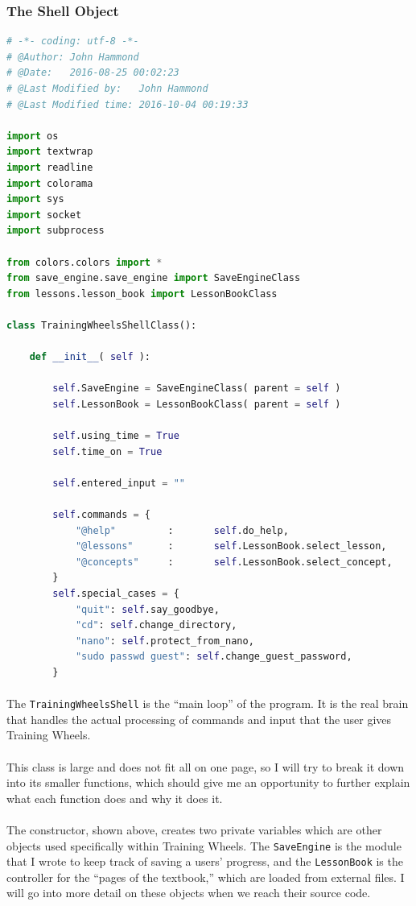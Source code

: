 \documentclass[11pt]{article}
\begin{document}
	\subsubsection{The Shell Object}

	\begin{lstlisting}[language=Python]
# -*- coding: utf-8 -*-
# @Author: John Hammond
# @Date:   2016-08-25 00:02:23
# @Last Modified by:   John Hammond
# @Last Modified time: 2016-10-04 00:19:33

import os
import textwrap
import readline
import colorama
import sys
import socket
import subprocess

from colors.colors import *
from save_engine.save_engine import SaveEngineClass
from lessons.lesson_book import LessonBookClass

class TrainingWheelsShellClass():

	def __init__( self ):

		self.SaveEngine = SaveEngineClass( parent = self )
		self.LessonBook = LessonBookClass( parent = self )

		self.using_time = True
		self.time_on = True

		self.entered_input = ""

		self.commands = {
			"@help" 		: 		self.do_help,		
			"@lessons" 		:	 	self.LessonBook.select_lesson,
			"@concepts" 	:	 	self.LessonBook.select_concept,
		}
		self.special_cases = {
			"quit": self.say_goodbye,
			"cd": self.change_directory,
			"nano": self.protect_from_nano,
			"sudo passwd guest": self.change_guest_password,
		}
	\end{lstlisting}

	\paragraph{} The \texttt{TrainingWheelsShell} is the ``main loop'' of the program. It is the real brain that handles the actual processing of commands and input that the user gives Training Wheels. 

	\paragraph{} This class is large and does not fit all on one page, so I will try to break it down into its smaller functions, which should give me an opportunity to further explain what each function does and why it does it.

	\paragraph{} The constructor, shown above, creates two private variables which are other objects used specifically within Training Wheels. The \texttt{SaveEngine} is the module that I wrote to keep track of saving a users' progress, and the \texttt{LessonBook} is the controller for the ``pages of the textbook,'' which are loaded from external files. I will go into more detail on these objects when we reach their source code.
\end{document}
